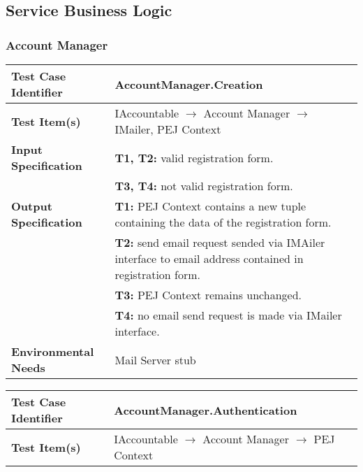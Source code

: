 {\renewcommand{\arraystretch}{1.2}%

\subsection{Service Business Logic}
\subsubsection{Account Manager}
\begin{tabularx}{\textwidth}{l X}
    \hline 
    \textbf{Test Case Identifier} & AccountManager.Creation\\ 
    \hline 
    
    \textbf{Test Item(s)} & IAccountable $\rightarrow$ Account Manager $\rightarrow$ IMailer, PEJ Context\\
    \hline 
    
    \textbf{Input Specification} &  \textbf{T1, T2:} valid registration form.\\
                                &   \textbf{T3, T4:} not valid registration form.\\

    \hline 
    
    \textbf{Output Specification} & \textbf{T1:} PEJ Context contains a new tuple containing the data of the registration form.\\
                                &   \textbf{T2:} send email request sended via IMAiler interface to email address contained in registration form.\\
                                & \textbf{T3:} PEJ Context remains unchanged.\\
                                & \textbf{T4:} no email send request is made via IMailer interface.\\
    \hline 
    
    \textbf{Environmental Needs} &  Mail Server stub\\
    \hline
\end{tabularx}
\bigskip

\noindent 
\begin{tabularx}{\textwidth}{l X}
    \hline 
    \textbf{Test Case Identifier} & AccountManager.Authentication\\ 
    \hline 
    
    \textbf{Test Item(s)} & IAccountable $\rightarrow$ Account Manager $\rightarrow$ PEJ Context\\
    \hline 
    

\end{tabularx}}
